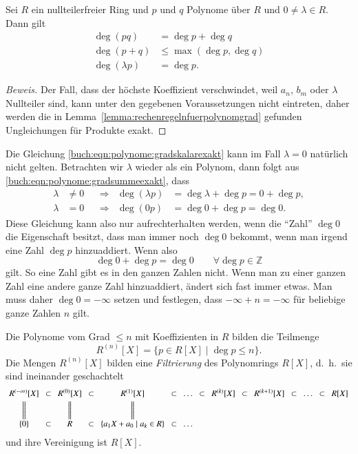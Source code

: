 \begin{lemma}
Sei $R$ ein nullteilerfreier Ring und $p$ und $q$ Polynome über $R$
und $0\ne \lambda\in R$.
Dann gilt
\begin{align}
\deg(pq) &= \deg p + \deg q
\label{buch:eqn:polynome:gradsummeexakt}
\\
\deg(p+q) &\le \max(\deg p, \deg q)
\label{buch:eqn:polynome:gradproduktexakt}
\\
\deg(\lambda p) &= \deg p.
\label{buch:eqn:polynome:gradskalarexakt}
\end{align}
\end{lemma}

\begin{proof}[Beweis]
Der Fall, dass der höchste Koeffizient verschwindet, weil $a_n$, $b_m$
oder $\lambda$ Nullteiler sind, kann unter den gegebenen Voraussetzungen
nicht eintreten, daher werden die in
Lemma~\ref{lemma:rechenregelnfuerpolynomgrad} gefunden Ungleichungen
für Produkte exakt.
\end{proof}

Die Gleichung
\eqref{buch:eqn:polynome:gradskalarexakt}
kann im Fall $\lambda=0$ natürlich nicht gelten.
Betrachten wir $\lambda$ wieder als ein Polynom, dann folgt aus
\eqref{buch:eqn:polynome:gradsummeexakt}, dass
\[
\begin{aligned}
\lambda&\ne 0  &&\Rightarrow& \deg (\lambda p) &= \deg\lambda + \deg p = 0+\deg p,
\\
\lambda&=0     &&\Rightarrow& \deg (0 p) &= \deg 0 + \deg p = \deg 0.
\end{aligned}
\]
Diese Gleichung kann also nur aufrechterhalten werden, wenn die ``Zahl'' $\deg 0$ die Eigenschaft besitzt, dass man immer noch $\deg 0$ bekommt,
wenn man irgend eine Zahl $\deg p$ hinzuaddiert. Wenn also
\[\deg 0 + \deg p = \deg 0 \qquad \forall \deg p \in \mathbb Z\]
gilt.
So eine Zahl gibt es in den ganzen Zahlen nicht.
Wenn man zu einer ganzen Zahl eine andere ganze Zahl hinzuaddiert, ändert sich fast immer etwas.
Man muss daher $\deg 0 = -\infty$ setzen und festlegen, dass
$-\infty + n = -\infty$ für beliebige ganze Zahlen $n$ gilt.

\begin{definition}
\label{buch:def:definitionen:polynomfilterung}
Die Polynome vom Grad $\le n$ mit Koeffizienten in $R$
bilden die Teilmenge
\[
R^{(n)}[X]
=
\{ p\in R[X] \mid \deg p \le n\}.
\]
Die Mengen $R^{(n)}[X]$ bilden eine {\em Filtrierung} des Polynomrings
$R[X]$, d.~h.~sie sind ineinander geschachtelt
\[
\arraycolsep=4pt
\begin{array}{ccccccccccccccc}
R^{(-\infty)}[X] & \subset
	& R^{(0)}[X] & \subset
		& R^{(1)}[X] & \subset & \dots & \subset
			& R^{(k)}[X] & \subset
				& R^{(k+1)}[X] & \subset & \dots & \subset
					& R[X]\\[3pt]
\bigg\| &
	&\bigg\| &
		&\bigg\| & & &
			&&
				&& & &
					&
\\[3pt]
\{0\} & \subset
	& R & \subset
		& \{a_1X+a_0 \mid a_k\in R\} & \subset & \dots &
\end{array}
\]
und ihre Vereinigung ist $R[X]$.
\end{definition}

